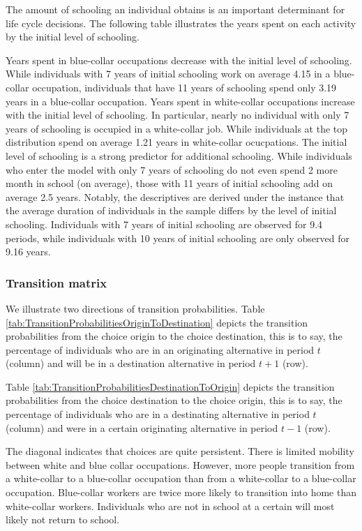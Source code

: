 The amount of schooling an individual obtains is an important determinant for life cycle decisions. The following table illustrates the years spent on each activity by the initial level of schooling.

Years spent in blue-collar occupations decrease with the initial level of schooling. While individuals with 7 years of initial schooling work on average 4.15 in a blue-collar occupation, individuals that have 11 years of schooling spend only 3.19 years in a blue-collar occupation. Years spent in white-collar occupations increase with the initial level of schooling. In particular, nearly no individual with only 7 years of schooling is occupied in a white-collar job. While individuals at the top distribution spend on average 1.21 years in white-collar ocucpations. The initial level of schooling is a strong predictor for additional schooling. While individuals who enter the model with only 7 years of schooling do not even spend 2 more month in school (on average), those with 11 years of initial schooling add on average 2.5 years. Notably, the descriptives are derived under the instance that the average duration of individuals in the sample differs by the level of initial schooling. Individuals with 7 years of initial schooling are observed for 9.4 periods, while individuals with 10 years of initial schooling are only observed for 9.16 years.

\subsubsection*{Transition matrix}
We illustrate two directions of transition probabilities. Table \ref{tab:TransitionProbabilitiesOriginToDestination} depicts the transition probabilities from the choice origin to the choice destination, this is to say, the percentage of individuals who are in an originating alternative in period $t$ (column) and will be in a destination alternative in period $t+1$ (row).

Table \ref{tab:TransitionProbabilitiesDestinationToOrigin} depicts the transition probabilities from the choice destination to the choice origin, this is to say, the percentage of individuals who are in a destinating alternative in period $t$ (column) and were in a certain originating alternative in period $t-1$ (row).

The diagonal indicates that choices are quite persistent. There is limited mobility between white and blue collar occupations. However, more people transition from a white-collar to a blue-collar occupation than from a white-collar to a blue-collar occupation. Blue-collar workers are twice more likely to transition into home than white-collar workers. Individuals who are not in school at a certain will most likely not return to school.


